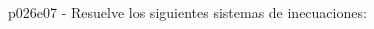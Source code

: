 \documentclass[spanish, 11pt]{exam}
\begin{document}
\begin{questions}
\begin{multicols}{2}
\begin{parts}
        \end{parts}
        \end{multicols}
        \question p026e07 - Resuelve los siguientes sistemas de inecuaciones:
\end{questions}
\end{document}
